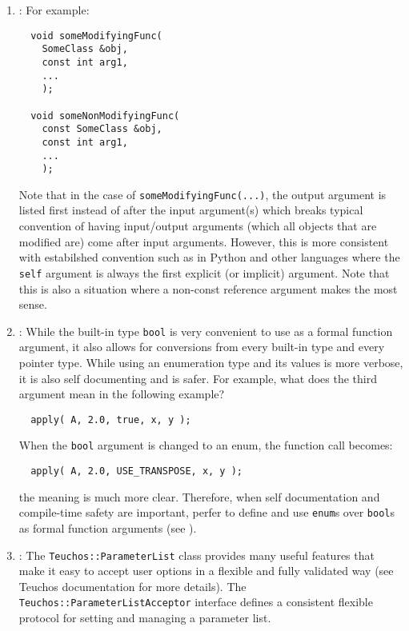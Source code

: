 \begin{enumerate}
{}\item\GCGNomemberObjectFuncs: For example:

{\small\begin{verbatim}
  void someModifyingFunc(
    SomeClass &obj,
    const int arg1,
    ...
    );

  void someNonModifyingFunc(
    const SomeClass &obj,
    const int arg1,
    ...
    );
\end{verbatim}}

Note that in the case of {}\texttt{someModifyingFunc(...)}, the output
argument is listed first instead of after the input argument(s) which breaks
typical convention of having input/output arguments (which all objects that
are modified are) come after input arguments.  However, this is more
consistent with estabilshed convention such as in Python and other languages
where the {}\texttt{self} argument is always the first explicit (or implicit)
argument.  Note that this is also a situation where a non-const reference
argument makes the most sense.

{}\item\GCGEnumFuncArgs: While the built-in type {}\texttt{bool} is very convenient
to use as a formal function argument, it also allows for conversions from
every built-in type and every pointer type.  While using an enumeration type
and its values is more verbose, it is also self documenting and is safer.  For
example, what does the third argument mean in the following example?

{\small\begin{verbatim}
  apply( A, 2.0, true, x, y );
\end{verbatim}}

When the {}\texttt{bool} argument is changed to an enum, the function call
becomes:

{\small\begin{verbatim}
  apply( A, 2.0, USE_TRANSPOSE, x, y );
\end{verbatim}}

the meaning is much more clear.  Therefore, when self documentation and
compile-time safety are important, perfer to define and use {}\texttt{enum}s
over {}\texttt{bool}s as formal function arguments (see {}\cite[Section
12.6]{CodeComplete2nd04}).

{}\item\GCGTeuchosParamterListAcceptor: The {}\texttt{Teuchos\-::Parameter\-List}
class provides many useful features that make it easy to accept user options
in a flexible and fully validated way (see Teuchos documentation for more
details).  The {}\texttt{Teuchos\-::Parameter\-List\-Acceptor} interface
defines a consistent flexible protocol for setting and managing a parameter
list.


\end{enumerate}
